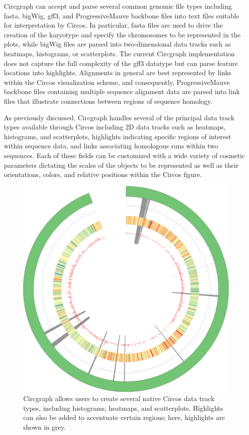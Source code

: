 \documentclass[twocolumn]{article}
\begin{document}
Circgraph can accept and parse several common genomic file types including fasta, bigWig, gff3, and ProgressiveMauve backbone files into text files suitable for interpretation by Circos. In particular, fasta files are used to drive the creation of the karyotype and specify the chromosomes to be represented in the plots, while bigWig files are parsed into two-dimensional data tracks such as heatmaps, histograms, or scatterplots. The current Circgraph implementation does not capture the full complexity of the gff3 datatype but can parse feature locations into highlights. Alignments in general are best represented by links within the Circos visualization scheme, and consequently, ProgressiveMauve backbone files containing multiple sequence alignment data are parsed into link files that illustrate connections between regions of sequence homology.  

As previously discussed, Circgraph handles several of the principal data track types available through Circos including 2D data tracks such as heatmaps, histograms, and scatterplots, highlights indicating specific regions of interest within sequence data, and links associating homologous runs within two sequences. Each of these fields can be customized with a wide variety of cosmetic parameters dictating the scales of the objects to be represented as well as their orientations, colors, and relative positions within the Circos figure. 

\begin{figure}
\centering
\includegraphics[scale=0.1]{./results/hilite.png}
\caption{Circgraph allows users to create several native Circos data track types, including histograms, heatmaps, and scatterplots. Highlights can also be added to accentuate certain regions; here, highlights are shown in grey.}
\end{figure}
\end{document}
